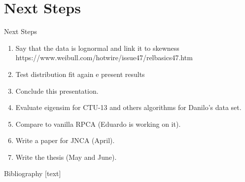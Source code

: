 \documentclass[newPxFont, numfooter, sectionpages]{beamer}
\begin{document}
\section{Next Steps}
\begin{frame}[c]{Next Steps}
	\begin{enumerate}
		\item Say that the data is lognormal \cite{benson2010network} and link it to skewness https://www.weibull.com/hotwire/issue47/relbasics47.htm
		\item Test distribution fit again e present results
	    \item Conclude this presentation.
		\item Evaluate eigensim for CTU-13 and others algorithms for Danilo's data set.
		\item Compare to vanilla RPCA (Eduardo is working on it).
		\item Write a paper for JNCA (April).
		\item Write the thesis (May and June).
	\end{enumerate}
\end{frame}


\begin{frame}{Bibliography}
	[text]
	\printbibliography
\end{frame}
\end{document}
